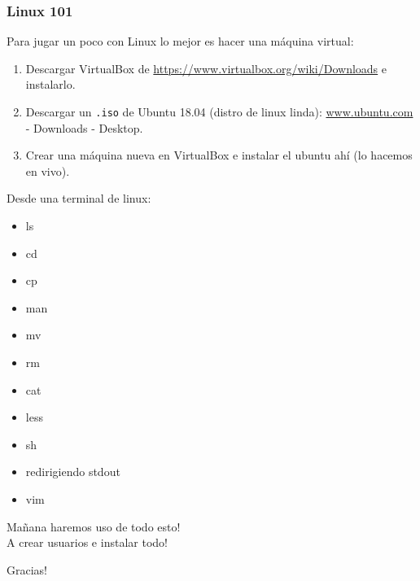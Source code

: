 \documentclass[]{beamer}
\begin{document}
\begin{frame}
\frametitle{Linux 101}
Para jugar un poco con Linux lo mejor es hacer una máquina virtual:

\begin{enumerate}
  \item Descargar VirtualBox de \url{https://www.virtualbox.org/wiki/Downloads} e instalarlo.
  \item Descargar un \Verb=.iso= de Ubuntu 18.04 (distro de linux linda): \url{www.ubuntu.com} - Downloads - Desktop.
  \item Crear una máquina nueva en VirtualBox e instalar el ubuntu ahí (lo hacemos en vivo).
  \end{enumerate}

\end{frame}

\begin{frame}
Desde una terminal de linux:
 \begin{itemize}
  \item ls
  \item cd
  \item cp
  \item man
  \item mv
  \item rm
  \item cat
  \item less
  \item sh
  \item redirigiendo stdout
  \item vim
 \end{itemize}
\end{frame}

\begin{frame}
\huge{Mañana haremos uso de todo esto!\\A crear usuarios e instalar todo!}

\huge{Gracias!}
\end{frame}
\end{document}
